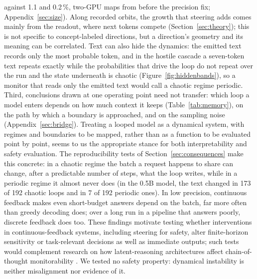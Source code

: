 \documentclass[11pt,letterpaper]{article}
\begin{document}
against 1.1 and 0.2\,\%, two-GPU maps from before the precision fix; Appendix~\ref{sec:size}). Along recorded orbits, the growth that steering adds comes mainly from the readout, where next tokens compete
(Section~\ref{sec:theory}); this is not specific to concept-labeled directions, but a direction's geometry and its
meaning can be correlated. Text can
also hide the dynamics: the emitted text records only the most probable token, and in the hostile cascade a
seven-token text repeats exactly while the probabilities that drive the loop do not repeat over the run and the state
underneath is chaotic (Figure~\ref{fig:hiddenbands}), so a monitor that reads only the emitted text would call a chaotic regime
periodic.
Third, conclusions drawn at one operating point need not transfer: which loop a
model enters depends on how much context it keeps (Table~\ref{tab:memory}), on the path by which a boundary is
approached, and on the sampling noise (Appendix~\ref{sec:bridge}). Treating a looped model as a dynamical system, with
regimes and boundaries to be mapped, rather than as a function to be evaluated point by point, seems to us the
appropriate stance for both interpretability and safety evaluation. The reproducibility tests of
Section~\ref{sec:consequences} make this concrete: in a chaotic regime the batch a request happens to share can change,
after a predictable number of steps, what the loop writes, while in a periodic regime it almost never does (in the
0.5B model, the text changed in 173 of 192 chaotic loops and in 7 of 192 periodic ones). In low precision, continuous feedback makes even short-budget
answers depend on the batch, far more often than greedy decoding does; over a long run in a pipeline that answers poorly, discrete feedback does too. These findings motivate testing whether interventions in continuous-feedback
systems, including steering for safety, alter finite-horizon sensitivity or task-relevant decisions as well as
immediate outputs; such tests would complement research on how latent-reasoning architectures affect chain-of-thought
monitorability \cite{korbak2025monitorability}. We tested no safety property: dynamical instability is neither
misalignment nor evidence of it.
\end{document}
